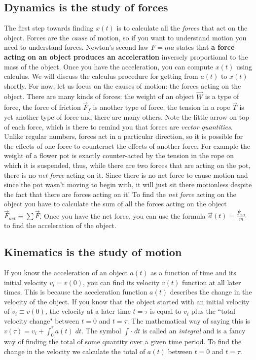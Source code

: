 \documentclass[letterpaper,9pt,journal]{IEEEtran}
\begin{document}
\subsection{Dynamics is the study of forces}
The first step towards finding $x(t)$ is to calculate all the \emph{forces} that act on the object.
Forces are the \emph{cause} of motion, so if you want to understand motion you need to understand forces. 
Newton's second law $F=ma$ states that {\bf a force acting on an object produces an acceleration}
inversely proportional to the mass of the object. 
Once you have the acceleration, you can compute $x(t)$ using calculus.
We will discuss the calculus procedure for getting from $a(t)$ to $x(t)$ shortly.
For now, let us focus on the causes of motion: the forces acting on the object.
There are many kinds of forces: the weight of an object $\vec{W}$ is a type of force, 
the force of friction $\vec{F}_f$ is another type of force, the tension in a rope $\vec{T}$ is 
yet another type of force and there are many others.
Note the little arrow on top of each force, which is there to remind you that forces are \emph{vector quantities}.
Unlike regular numbers, forces act in a particular direction, so it is possible for the effects of 
one force to counteract the effects of another force. For example the weight of a flower pot 
is exactly counter-acted by the tension in the rope on which it is suspended, thus,
while there are two forces that are acting on the pot, there is no \emph{net force} acting on it.
Since there is no net force to cause motion and since the pot wasn't moving to begin with, 
it will just sit there motionless despite the fact that there are forces acting on it!
To find the \emph{net force} acting on the object you have to calculate 
the sum of all the forces acting on the object $\vec{F}_{net} \equiv \sum \vec{F}$.
Once you have the net force, you can use the formula $\vec{a}(t) = \frac{\vec{F}_{net}}{m}$ 
to find the acceleration of the object.

\vspace{-2mm}
\subsection{Kinematics is the study of motion}
If you know the acceleration of an object $a(t)$ as a function of time and its initial velocity $v_i=v(0)$, 
you can find its velocity $v(t)$ function at all later times. 
This is because the acceleration function $a(t)$ describes the change in the velocity of the object.
If you know that the object started with an initial velocity of $v_i \equiv v(0)$,
the velocity at a later time $t=\tau$ is equal to $v_i$ plus the ``total velocity change" between $t=0$ and $t=\tau$.
The mathematical way of saying this is $v(\tau)=v_i+\int_0^\tau a(t)\;dt$.
The symbol $\int \cdot \;dt$ is called an \emph{integral} and is a fancy way of finding the total
of some quantity over a given time period. 
To find the change in the velocity we calculate the total of $a(t)$ between $t=0$ and $t=\tau$.
\end{document}
